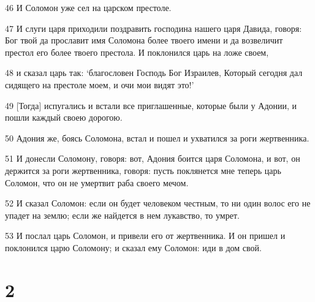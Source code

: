 \par 46 И Соломон уже сел на царском престоле.
\par 47 И слуги царя приходили поздравить господина нашего царя Давида, говоря: Бог твой да прославит имя Соломона более твоего имени и да возвеличит престол его более твоего престола. И поклонился царь на ложе своем,
\par 48 и сказал царь так: `благословен Господь Бог Израилев, Который сегодня дал сидящего на престоле моем, и очи мои видят это!'
\par 49 [Тогда] испугались и встали все приглашенные, которые были у Адонии, и пошли каждый своею дорогою.
\par 50 Адония же, боясь Соломона, встал и пошел и ухватился за роги жертвенника.
\par 51 И донесли Соломону, говоря: вот, Адония боится царя Соломона, и вот, он держится за роги жертвенника, говоря: пусть поклянется мне теперь царь Соломон, что он не умертвит раба своего мечом.
\par 52 И сказал Соломон: если он будет человеком честным, то ни один волос его не упадет на землю; если же найдется в нем лукавство, то умрет.
\par 53 И послал царь Соломон, и привели его от жертвенника. И он пришел и поклонился царю Соломону; и сказал ему Соломон: иди в дом свой.

\chapter{2}

